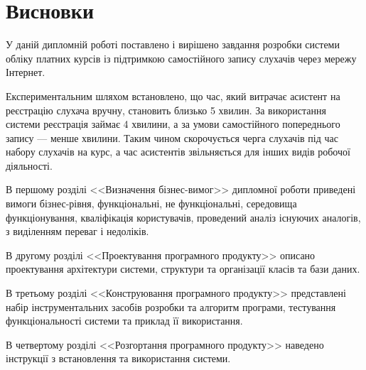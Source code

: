 \bigskip
\section*{Висновки}
\bigskip
У даній дипломній роботі поставлено і вирішено завдання розробки системи обліку платних курсів із підтримкою самостійного запису слухачів через мережу Інтернет.

Експериментальним шляхом встановлено, що час, який витрачає асистент на реєстрацію слухача вручну, становить близько 5 хвилин. За використання системи реєстрація займає 4 хвилини, а за умови самостійного попереднього запису --- менше хвилини. Таким чином скорочується черга слухачів під час набору слухачів на курс, а час асистентів звільняється для інших видів робочої діяльності.

В першому розділі <<Визначення бізнес-вимог>> дипломної роботи приведені вимоги бізнес-рівня, функціональні, не функціональні, середовища функціонування, кваліфікація користувачів, проведений аналіз існуючих аналогів, з виділенням  переваг і недоліків.

В другому розділі <<Проектування програмного продукту>> описано проектування архітектури системи, структури та організації класів та бази даних.

В третьому розділі <<Конструювання програмного продукту>> представлені набір інструментальних засобів розробки та алгоритм програми, тестування функціональності системи та приклад її використання.

В четвертому розділі <<Розгортання програмного продукту>> наведено інструкції з встановлення та використання системи.
